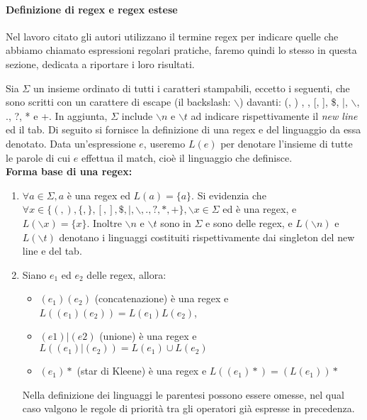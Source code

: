 \paragraph{Definizione di regex e regex estese}
Nel lavoro citato gli autori utilizzano il termine regex per indicare quelle che abbiamo chiamato espressioni regolari pratiche, faremo quindi lo stesso in questa sezione, dedicata a riportare i loro risultati.
\begin{definizione}
	Sia $\Sigma$ un insieme ordinato di tutti i caratteri stampabili, eccetto i seguenti, che sono scritti con un carattere di escape (il backslash: $\backslash$) davanti: (, ) {, }, [, ], \$, |, $\backslash$, ., ?, * e +. In aggiunta, $\Sigma$ include $\backslash n$ e $\backslash t$ ad indicare rispettivamente il \textit{new line} ed il tab. Di seguito si fornisce la definizione di una regex e del linguaggio da essa denotato. Data un'espressione $e$, useremo $L(e)$ per denotare l'insieme di tutte le parole di cui $e$ effettua il match, cioè il linguaggio che definisce.\\
	\textbf{Forma base di una regex:}
	\begin{enumerate}
		\item $\forall a \in \Sigma, a$ è una regex ed $L(a) = \{a\}$. Si evidenzia che $\forall x \in  \{(, ), \{, \}, [, ], \$, \mid, \backslash, ., ?, *, +\}, \backslash x \in \Sigma$ ed è una regex, e $L(\backslash x) = \{x\}$. Inoltre $\backslash n$ e $\backslash t$ sono in $\Sigma$ e sono delle regex, e $L(\backslash n)$ e $L(\backslash t)$ denotano i linguaggi costituiti rispettivamente dai singleton del new line e del tab.
		
		\item Siano $e_1$ ed $e_2$ delle regex, allora:
		\begin{itemize}
			\item $(e_1)(e_2)$ (concatenazione) è una regex e $L((e_1)(e_2)) = L(e_1)L(e_2)$,
			\item $(e1)|(e2)$ (unione) è una regex e $L((e_1)|(e_2)) = L(e_1) \cup L(e_2)$
			\item $(e_1)*$ (star di Kleene) è una regex e $L((e_1)*) = (L(e_1))*$
		\end{itemize}
		Nella definizione dei linguaggi le parentesi possono essere omesse, nel qual caso valgono le regole di priorità tra gli operatori già espresse in precedenza.
		

\end{enumerate}
\end{definizione}
